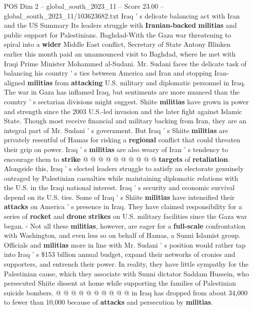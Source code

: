 \begin{textsample}{POS Dim 2 – global\_south\_2023\_11 – Score 23.00 – global\_south\_2023\_11/103623682.txt}  \label{ex:f2_pos_211}
Iraq ' s delicate balancing act with Iran and the US Summary Its leaders struggle with \textbf{Iranian-backed} \textbf{militias} and public support for Palestinians.
Baghdad-With the Gaza war threatening to spiral into a \textbf{wider} Middle East conflict, Secretary of State Antony Blinken earlier this month paid an unannounced visit to Baghdad, where he met with Iraqi Prime Minister Mohammed al-Sudani.
Mr.
Sudani faces the delicate task of balancing his country ' s ties between America and Iran and stopping Iran-aligned \textbf{militias} from \textbf{attacking} U.S. military and diplomatic personnel in Iraq.
The war in Gaza has inflamed Iraq, but sentiments are more nuanced than the country ' s sectarian divisions might suggest.
Shiite \textbf{militias} have grown in power and strength since the 2003 U.S.-led invasion and the later fight against Islamic State.
Though most receive financial and military backing from Iran, they are an integral part of Mr.
Sudani ' s government.
But Iraq ' s Shiite \textbf{militias} are privately resentful of Hamas for risking a \textbf{regional} conflict that could threaten their grip on power.
Iraq ' s \textbf{militias} are also weary of Iran ' s tendency to encourage them to \textbf{strike} @ @ @ @ @ @ @ @ @ @ \textbf{targets} of \textbf{retaliation}.
Alongside this, Iraq ' s elected leaders struggle to satisfy an electorate genuinely outraged by Palestinian casualties while maintaining diplomatic relations with the U.S. in the Iraqi national interest.
Iraq ' s security and economic survival depend on its U.S. ties.
Some of Iraq ' s Shiite \textbf{militias} have intensified their \textbf{attacks} on America ' s presence in Iraq.
They have claimed responsibility for a series of \textbf{rocket} and \textbf{drone} \textbf{strikes} on U.S. military facilities since the Gaza war began. - Not all these \textbf{militias}, however, are eager for a \textbf{full-scale} confrontation with Washington, and even less so on behalf of Hamas, a Sunni Islamist group.
Officials and \textbf{militias} more in line with Mr.
Sudani ' s position would rather tap into Iraq ' s \$153 billion annual budget, expand their networks of cronies and supporters, and entrench their power.
In reality, they have little sympathy for the Palestinian cause, which they associate with Sunni dictator Saddam Hussein, who persecuted Shiite dissent at home while supporting the families of Palestinian suicide bombers. @ @ @ @ @ @ @ @ @ @ in Iraq has dropped from about 34,000 to fewer than 10,000 because of \textbf{attacks} and persecution by \textbf{militias}.

\end{textsample}
